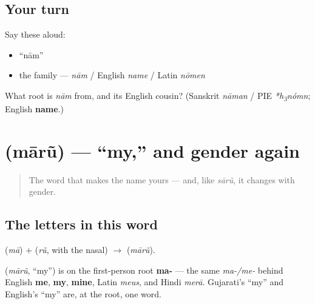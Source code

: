 \subsection*{Your turn}
Say these aloud:

\begin{itemize}
\raggedright
  \item \textquotedblleft{}nām\textquotedblright{}
  \item the family — \emph{nām} / English \emph{name} / Latin \emph{nōmen}
\end{itemize}

\begin{tcolorbox}[breakable,colback=teal!4,colframe=teal!35!black,title={Before you move on}]
What root is \emph{nām} from, and its English cousin? (Sanskrit \emph{nāman} / PIE \emph{*h\textsubscript{3}nómn}; English \textbf{name}.)
\end{tcolorbox}
\section[\gu{મારું}]{ (mārũ) — \textquotedblleft{}my,\textquotedblright{} and gender again}

\label{lesson:GU-C02-maarun}



\begin{quote}
The word that makes the name yours — and, like \emph{sārũ}, it changes with gender.
\end{quote}

\subsection*{The letters in this word}
\textbf{} (\emph{mā}) + \textbf{} (\emph{rũ}, with the nasal) $\to$ \textbf{} (\emph{mārũ}).

\begin{cousinweb}
\textbf{} (\emph{mārũ}, \textquotedblleft{}my\textquotedblright{}) is on the first-person root \textbf{ma-} — the same \emph{ma-/me-} behind English \textbf{me}, \textbf{my}, \textbf{mine}, Latin \emph{meus}, and Hindi \emph{merā}. Gujarati's \textquotedblleft{}my\textquotedblright{} and English's \textquotedblleft{}my\textquotedblright{} are, at the root, one word.
\end{cousinweb}

